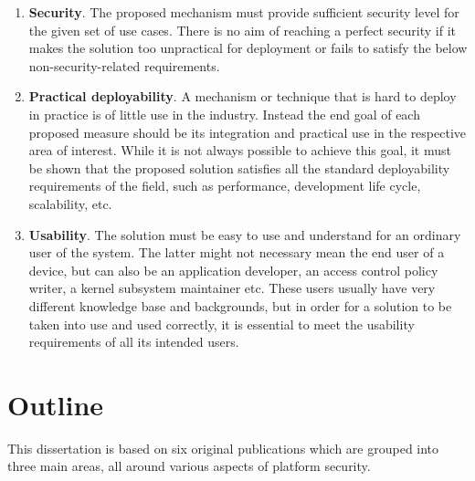 \begin{enumerate}
	\item \textbf{Security}. The proposed mechanism must provide sufficient security level for the given set of use cases. There is no aim of reaching a perfect security if it makes the solution too unpractical for deployment or fails to satisfy the below non-security-related requirements.      
	\item \textbf{Practical deployability}. A mechanism or technique that is hard to deploy in practice is of little use in the industry. Instead the end goal of each proposed measure should be its integration and practical use in the respective area of interest. While it is not always possible to achieve this goal, it must be shown that the proposed solution satisfies all the standard deployability requirements of the field, such as performance, development life cycle, scalability, etc.  
	\item \textbf{Usability}.	The solution must be easy to use and understand for an ordinary user of the system. The latter might not necessary mean the end user of a device, but can also be an application developer, an access control policy writer, a kernel subsystem maintainer etc. These users usually have very different knowledge base and backgrounds, but in order for a solution to be taken into use and used correctly, it is essential to meet the usability requirements of all its intended users. 
\end{enumerate}

\section{Outline}

This dissertation is based on six original publications which are grouped into three main areas, all around various aspects of platform security. 

